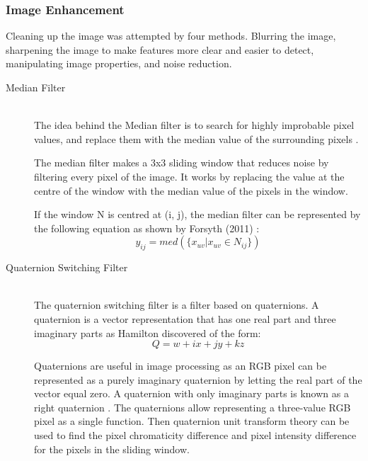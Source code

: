 \subsubsection{Image Enhancement}
Cleaning up the image was attempted by four methods. Blurring the image, sharpening the image to make features more clear and easier to detect, manipulating image properties, and noise reduction. 
\begin{description}
\item[Median Filter]\hfill \\The idea behind the Median filter is to search for highly improbable pixel values, and replace them with the median value of the surrounding pixels \cite{davies2012computer}.

The median filter makes a 3x3 sliding window that reduces noise by filtering every pixel of the image. It works by replacing the value at the centre of the window with the median value of the pixels in the window.

If the window N is centred at (i, j), the median filter can be represented by the following equation as shown by Forsyth (2011) \cite{forsyth2011computer}:
\begin{equation}
y_{ij}=med(\lbrace x_{uv}|x_{uv}\in N_{ij} \rbrace)
\end{equation}

\item[Quaternion Switching Filter]\hfill \\
The quaternion switching filter \cite{Geng2012150} is a filter based on quaternions.
A quaternion is a vector representation that has one real part and three imaginary parts as Hamilton discovered \cite{article:Hamilton1844} of the form:
\begin{equation}
Q=w+ix+jy+kz
\end{equation}

Quaternions are useful in image processing as an RGB pixel can be represented as a purely imaginary quaternion by letting the real part of the vector equal zero. A quaternion with only imaginary parts is known as a right quaternion \cite{article:Hamilton1866}.
The quaternions allow representing a three-value RGB pixel as a single function. Then quaternion unit transform theory can be used to find the pixel chromaticity difference and pixel intensity difference for the pixels in the sliding window.


\end{description}

